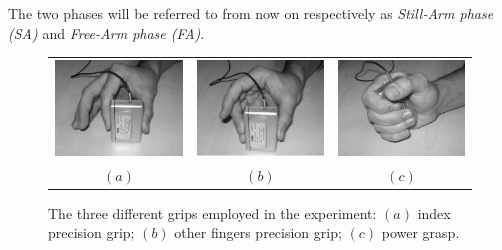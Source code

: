 The two phases will be referred to from now on respectively as \emph{Still-Arm phase (SA)} and \emph{Free-Arm phase (FA)}.

\begin{figure}[!t] \centering
  \begin{tabular}{ccc}
   \includegraphics[height=0.16\textheight]{figs/grip1} &
    \includegraphics[height=0.16\textheight]{figs/grip2} &
    \includegraphics[height=0.16\textheight]{figs/grip3} \\
    $(a)$ & $(b)$ & $(c)$ \\
  \end{tabular}
  \caption{The three different grips employed in the experiment: $(a)$
   index precision grip; $(b)$ other fingers precision grip; $(c)$
   power grasp.}
  \label{fig:Grasps}
\end{figure}

